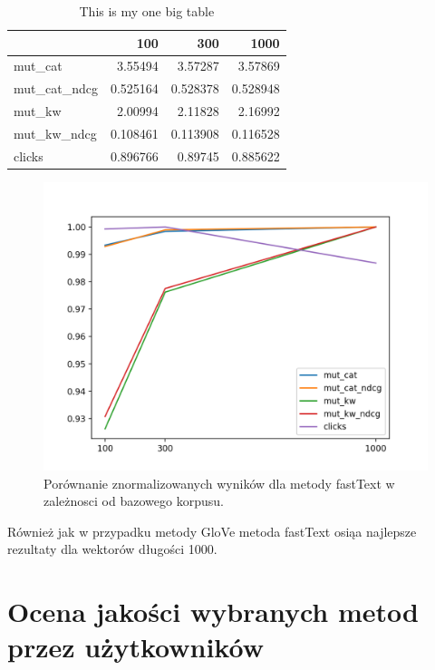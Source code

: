 \documentclass[pl]{minipw} %
\begin{document}
\begin{table}
	\centering
	\begin{tabular}{lrrr}
		\hline
		&      100 &      300 &     1000 \\
		\hline
		mut\_cat      & 3.55494  & 3.57287  & 3.57869  \\
		mut\_cat\_ndcg & 0.525164 & 0.528378 & 0.528948 \\
		mut\_kw       & 2.00994  & 2.11828  & 2.16992  \\
		mut\_kw\_ndcg  & 0.108461 & 0.113908 & 0.116528 \\
		clicks       & 0.896766 & 0.89745  & 0.885622 \\
		\hline
	\end{tabular}
	\caption{This is my one big table}
\end{table}

\begin{figure}[H]
	\centering
	\includegraphics[width=1\textwidth]{img/results/ft_ctr.png}
	\caption{Porównanie znormalizowanych wyników dla metody fastText w zależnosci od bazowego korpusu.}
\end{figure}

Również jak w przypadku metody GloVe metoda fastText osiąa najlepsze rezultaty dla wektorów długości 1000.

\section{Ocena jakości wybranych metod przez użytkowników}
\end{document}
